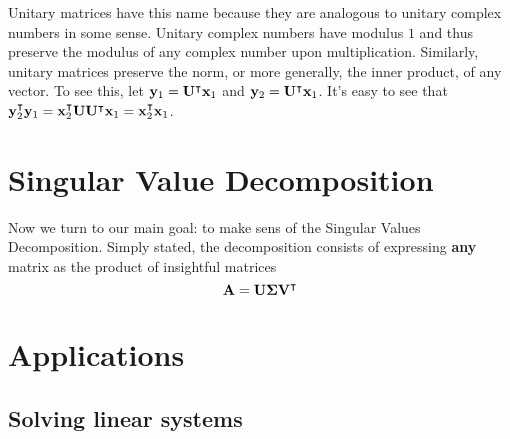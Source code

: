 \documentclass{article}
\begin{document}
 Unitary matrices have this name because they are analogous to unitary complex numbers in some sense. Unitary complex numbers have modulus $1$ and thus preserve the modulus of any complex number upon multiplication. Similarly, unitary matrices preserve the norm, or more generally, the inner product, of any vector. To see this, let $\vb{y}_1 = \vb{U}^\intercal \vb{x}_1$ and $\vb{y}_2 = \vb{U}^\intercal \vb{x}_1$. It's easy to see that $\vb{y}_2^\intercal \vb{y}_1 = \vb{x}_2^\intercal \vb{U} \vb{U}^\intercal \vb{x}_1 = \vb{x}_2^\intercal\vb{x}_1$.

\section{Singular Value Decomposition}
Now we turn to our main goal: to make sens of the Singular Values Decomposition. Simply stated, the decomposition consists of expressing \textbf{any} matrix as the product of insightful matrices
\begin{equation}
    \vb{A}=\vb{U}\boldsymbol{\Sigma}\vb{V}^\intercal
\end{equation}
\section{Applications}
\subsection{Solving linear systems}
\end{document}
